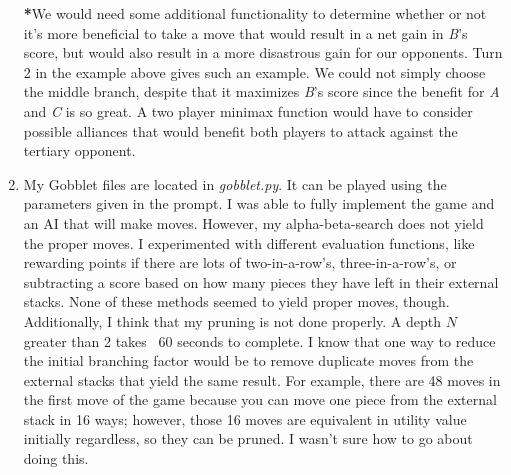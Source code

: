 \documentclass{article}
\begin{document}
\begin{enumerate}
    \textbf{*}We would need some additional functionality to determine whether or not it's more beneficial to take a move that would result in a net gain in \textit{B}'s score, but would also result in a more disastrous gain for our opponents. Turn 2 in the example above gives such an example. We could not simply choose the middle branch, despite that it maximizes \textit{B}'s score since the benefit for \textit{A} and \textit{C} is so great. A two player minimax function would have to consider possible alliances that would benefit both players to attack against the tertiary opponent.
    \item
    My Gobblet files are located in \textit{gobblet.py}. It can be played using the parameters given in the prompt. I was able to fully implement the game and an AI that will make moves. However, my alpha-beta-search does not yield the proper moves. I experimented with different evaluation functions, like rewarding points if there are lots of two-in-a-row's, three-in-a-row's, or subtracting a score based on how many pieces they have left in their external stacks. None of these methods seemed to yield proper moves, though. Additionally, I think that my pruning is not done properly. A depth \(N\) greater than 2 takes ~60 seconds to complete. I know that one way to reduce the initial branching factor would be to remove duplicate moves from the external stacks that yield the same result. For example, there are 48 moves in the first move of the game because you can move one piece from the external stack in 16 ways; however, those 16 moves are equivalent in utility value initially regardless, so they can be pruned. I wasn't sure how to go about doing this.

\end{enumerate}
\end{document}
